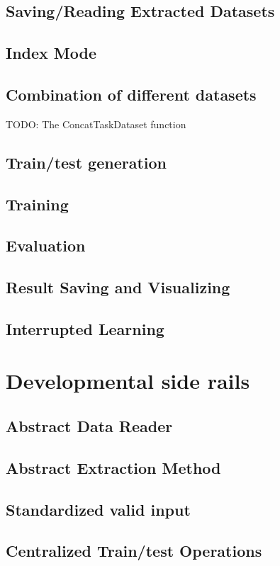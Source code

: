 \subsection{Saving/Reading Extracted Datasets}

\subsection{Index Mode}

\subsection{Combination of different datasets}
TODO: The ConcatTaskDataset function

\subsection{Train/test generation}

\subsection{Training}

\subsection{Evaluation}

\subsection{Result Saving and Visualizing}

\subsection{Interrupted Learning}

\section{Developmental side rails}

\subsection{Abstract Data Reader}

\subsection{Abstract Extraction Method}

\subsection{Standardized valid input}

\subsection{Centralized Train/test Operations}